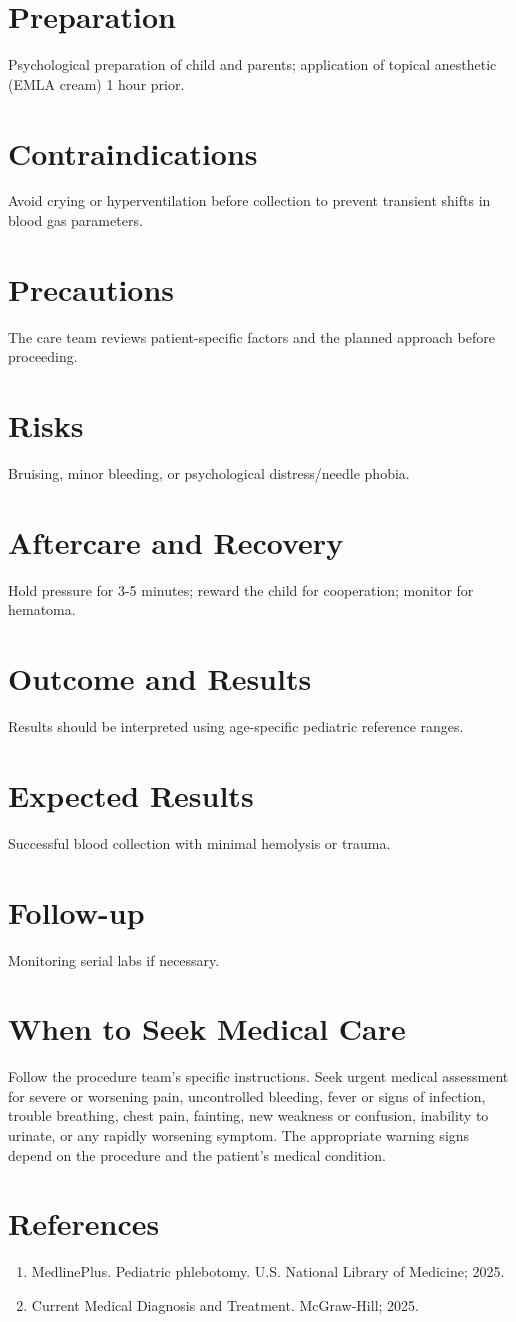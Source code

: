 \section*{Preparation}
Psychological preparation of child and parents; application of topical anesthetic (EMLA cream) 1 hour prior.

\section*{Contraindications}
Avoid crying or hyperventilation before collection to prevent transient shifts in blood gas parameters.

\section*{Precautions}
The care team reviews patient-specific factors and the planned approach before proceeding.

\section*{Risks}
Bruising, minor bleeding, or psychological distress/needle phobia.

\section*{Aftercare and Recovery}
Hold pressure for 3-5 minutes; reward the child for cooperation; monitor for hematoma.

\section*{Outcome and Results}
Results should be interpreted using age-specific pediatric reference ranges.

\section*{Expected Results}
Successful blood collection with minimal hemolysis or trauma.

\section*{Follow-up}
Monitoring serial labs if necessary.


\section*{When to Seek Medical Care}
Follow the procedure team's specific instructions. Seek urgent medical assessment for severe or worsening pain, uncontrolled bleeding, fever or signs of infection, trouble breathing, chest pain, fainting, new weakness or confusion, inability to urinate, or any rapidly worsening symptom. The appropriate warning signs depend on the procedure and the patient's medical condition.

\section*{References}
\begin{enumerate}
  \item MedlinePlus. Pediatric phlebotomy. U.S. National Library of Medicine; 2025.
  \item Current Medical Diagnosis and Treatment. McGraw-Hill; 2025.
\end{enumerate}

\clearpage
